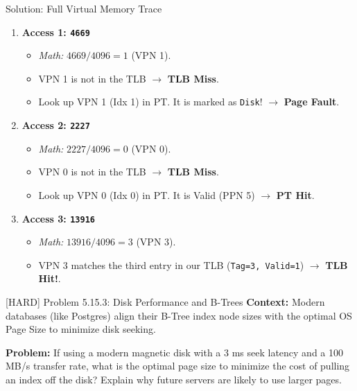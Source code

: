 \documentclass[aspectratio=169]{beamer}
\begin{document}
\begin{frame}{Solution: Full Virtual Memory Trace}
\begin{enumerate}
    \item \textbf{Access 1: \texttt{4669}}
    \begin{itemize}
        \item \textit{Math:} $4669 / 4096 = 1$ (VPN 1).
        \item VPN 1 is not in the TLB $\rightarrow$ \textbf{TLB Miss}.
        \item Look up VPN 1 (Idx 1) in PT. It is marked as \texttt{Disk}! $\rightarrow$ \textbf{Page Fault}.
    \end{itemize}
    \item \textbf{Access 2: \texttt{2227}}
    \begin{itemize}
        \item \textit{Math:} $2227 / 4096 = 0$ (VPN 0).
        \item VPN 0 is not in the TLB $\rightarrow$ \textbf{TLB Miss}.
        \item Look up VPN 0 (Idx 0) in PT. It is Valid (PPN 5) $\rightarrow$ \textbf{PT Hit}.
    \end{itemize}
    \item \textbf{Access 3: \texttt{13916}}
    \begin{itemize}
        \item \textit{Math:} $13916 / 4096 = 3$ (VPN 3).
        \item VPN 3 matches the third entry in our TLB (\texttt{Tag=3, Valid=1}) $\rightarrow$ \textbf{TLB Hit!}.
    \end{itemize}
\end{enumerate}
\end{frame}

\begin{frame}{[HARD] Problem 5.15.3: Disk Performance and B-Trees}
\textbf{Context:} Modern databases (like Postgres) align their B-Tree index node sizes with the optimal OS Page Size to minimize disk seeking.
\vspace{0.5cm}

\textbf{Problem:}
If using a modern magnetic disk with a 3 ms seek latency and a 100 MB/s transfer rate, what is the optimal page size to minimize the cost of pulling an index off the disk? Explain why future servers are likely to use larger pages.
\end{frame}
\end{document}
